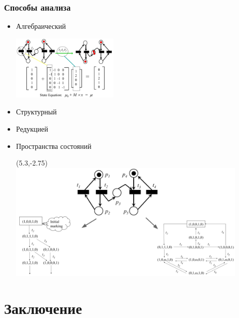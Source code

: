 \documentclass{../mcsslides}
\begin{document}
    \begin{frame}
        \frametitle{Способы анализа}
        \begin{itemize}
            \item Алгебраический

            \includegraphics[width=0.4\textwidth]{petriAlgebraicAnalysis.png}
            \item Структурный
            \item Редукцией
            \item Пространства состояний
            \begin{textblock}{6}(5.3,-2.75)
                \includegraphics[width=0.9\textwidth]{petriStateSpaceAnalysis.png}
            \end{textblock}
        \end{itemize}
    \end{frame}

    \section{Заключение}
\end{document}
